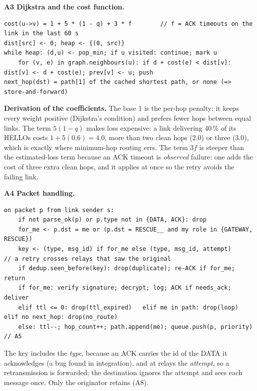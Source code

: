 \noindent\textbf{A3 Dijkstra and the cost function.}\label{sec:cost}
\begin{lstlisting}
cost(u->v) = 1 + 5 * (1 - q) + 3 * f        // f = ACK timeouts on the link in the last 60 s
dist[src] <- 0; heap <- {(0, src)}
while heap: (d,u) <- pop_min; if u visited: continue; mark u
    for (v, e) in graph.neighbours(u): if d + cost(e) < dist[v]: dist[v] <- d + cost(e); prev[v] <- u; push
next_hop(dst) = path[1] of the cached shortest path, or none (=> store-and-forward)
\end{lstlisting}
\textbf{Derivation of the coefficients.} The base 1 is the per-hop penalty; it keeps every weight positive (Dijkstra's condition) and prefers fewer hops between equal links. The term $5(1-q)$ makes loss expensive: a link delivering 40\,\% of its HELLOs costs $1+5(0.6)=4.0$, more than two clean hops (2.0) or three (3.0), which is exactly where minimum-hop routing errs. The term $3f$ is steeper than the estimated-loss term because an ACK timeout is \emph{observed} failure: one adds the cost of three extra clean hops, and it applies at once so the retry avoids the failing link.

\noindent\textbf{A4 Packet handling.}
\begin{lstlisting}
on packet p from link sender s:
    if not parse_ok(p) or p.type not in {DATA, ACK}: drop
    for_me <- p.dst = me or (p.dst = RESCUE__ and my role in {GATEWAY, RESCUE})
    key <- (type, msg_id) if for_me else (type, msg_id, attempt)     // a retry crosses relays that saw the original
    if dedup.seen_before(key): drop(duplicate); re-ACK if for_me; return
    if for_me: verify signature; decrypt; log; ACK if needs_ack; deliver
    elif ttl <= 0: drop(ttl_expired)   elif me in path: drop(loop)   elif no next_hop: drop(no_route)
    else: ttl--; hop_count++; path.append(me); queue.push(p, priority)            // A5
\end{lstlisting}
The key includes the \emph{type}, because an ACK carries the id of the DATA it acknowledges (a bug found in integration), and at relays the \emph{attempt}, so a retransmission is forwarded; the destination ignores the attempt and sees each message once. Only the originator retains (A8).

